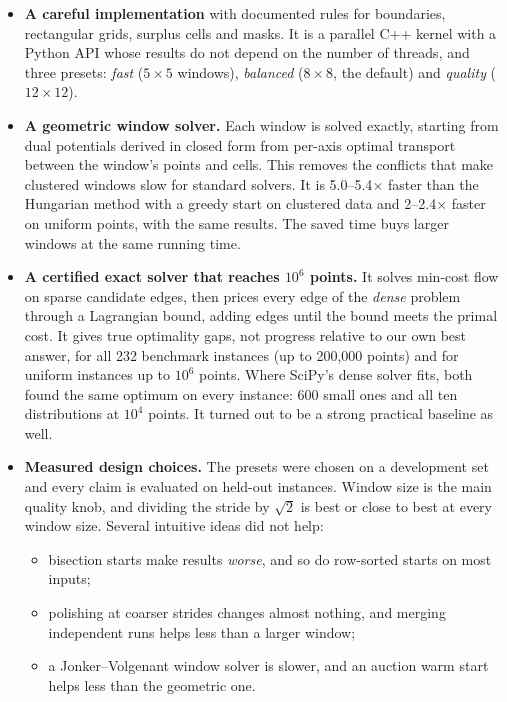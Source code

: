 \begin{itemize}
\item \textbf{A careful implementation} with documented rules for boundaries,
  rectangular grids, surplus cells and masks. It is a parallel C++ kernel with a Python
  API whose results do not depend on the number of threads, and three presets: \emph{fast}
  ($5\times5$ windows), \emph{balanced} ($8\times8$, the default) and \emph{quality}
  ($12\times12$).
\item \textbf{A geometric window solver.} Each window is solved exactly, starting from dual
  potentials derived in closed form from per-axis optimal transport between the window's
  points and cells. This removes the conflicts that make clustered windows slow for
  standard solvers. It is 5.0--5.4$\times$ faster than the Hungarian method with a greedy start
  on clustered data and 2--2.4$\times$ faster on uniform points, with the same results. The
  saved time buys larger windows at the same running time.
\item \textbf{A certified exact solver that reaches $10^6$ points.} It solves min-cost
  flow on sparse candidate edges, then prices every edge of the \emph{dense} problem
  through a Lagrangian bound, adding edges until the bound meets the primal cost. It gives
  true optimality gaps, not progress relative to our own best answer, for all 232 benchmark
  instances (up to 200{,}000 points) and for uniform instances up to $10^6$ points. Where
  SciPy's dense solver fits, both found the same optimum on every instance: 600 small ones
  and all ten distributions at $10^4$ points. It turned out to be a strong practical
  baseline as well.
\item \textbf{Measured design choices.} The presets were chosen on a development set and
  every claim is evaluated on held-out instances. Window size is the main quality knob,
  and dividing the stride by $\sqrt2$ is best or close to best at every window size.
  Several intuitive ideas did not help:
  \begin{itemize}
  \item bisection starts make results \emph{worse}, and so do row-sorted starts on most inputs;
  \item polishing at coarser strides changes almost nothing, and merging independent runs
    helps less than a larger window;
  \item a Jonker--Volgenant window solver is slower, and an auction warm start helps less
    than the geometric one.
  \end{itemize}

\end{itemize}
